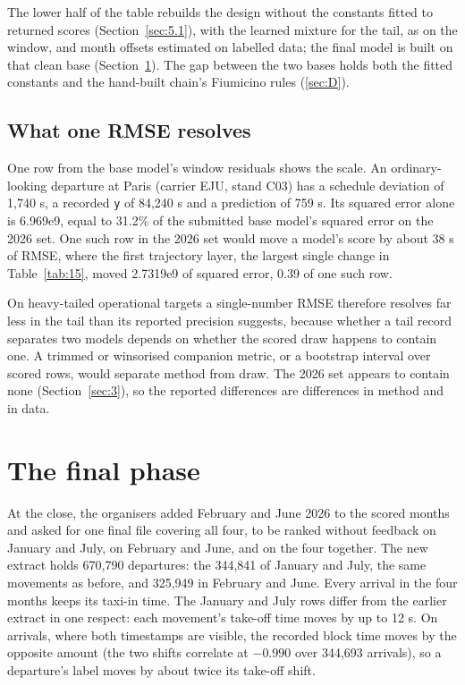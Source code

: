 \documentclass[
  manuscript=article,
  layout=preprint,
  year=2026,
  volume=x,
]{extra/joas}
\begin{document}
The lower half of the table rebuilds the design without the constants fitted to returned scores (Section~\ref{sec:5.1}), with the learned mixture for the tail, as on the window, and month offsets estimated on labelled data; the final model is built on that clean base (Section~\ref{sec:7}). The gap between the two bases holds both the fitted constants and the hand-built chain's Fiumicino rules (\ref{sec:D}).

\subsection{What one RMSE resolves}\label{sec:6.4}

One row from the base model's window residuals shows the scale. An ordinary-looking departure at Paris (carrier EJU, stand C03) has a schedule deviation of 1,740 s, a recorded \texttt{y} of 84,240 s and a prediction of 759 s. Its squared error alone is 6.969e9, equal to 31.2\% of the submitted base model's squared error on the 2026 set. One such row in the 2026 set would move a model's score by about 38 s of RMSE, where the first trajectory layer, the largest single change in Table~\ref{tab:15}, moved 2.7319e9 of squared error, 0.39 of one such row.

On heavy-tailed operational targets a single-number RMSE therefore resolves far less in the tail than its reported precision suggests, because whether a tail record separates two models depends on whether the scored draw happens to contain one. A trimmed or winsorised companion metric, or a bootstrap interval over scored rows, would separate method from draw. The 2026 set appears to contain none (Section~\ref{sec:3}), so the reported differences are differences in method and in data.
\section{The final phase}\label{sec:7}

At the close, the organisers added February and June 2026 to the scored months and asked for one final file covering all four, to be ranked without feedback on January and July, on February and June, and on the four together. The new extract holds 670,790 departures: the 344,841 of January and July, the same movements as before, and 325,949 in February and June. Every arrival in the four months keeps its taxi-in time. The January and July rows differ from the earlier extract in one respect: each movement's take-off time moves by up to 12 s. On arrivals, where both timestamps are visible, the recorded block time moves by the opposite amount (the two shifts correlate at $-0.990$ over 344,693 arrivals), so a departure's label moves by about twice its take-off shift.
\end{document}
